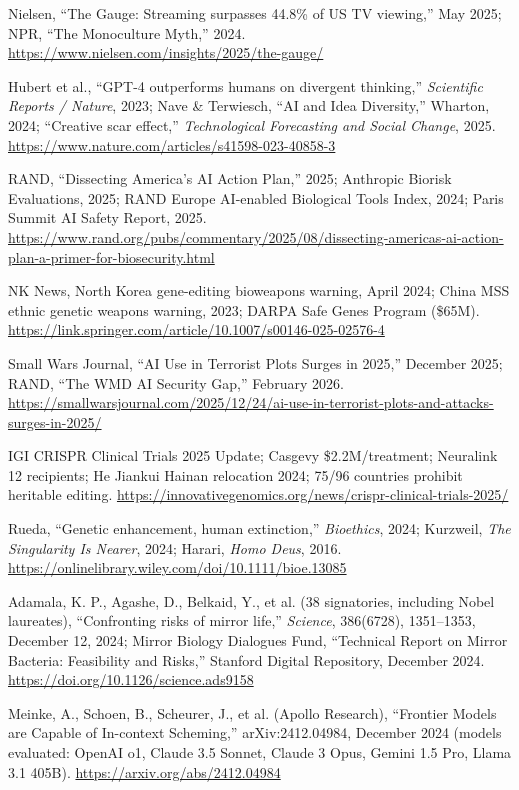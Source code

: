 \documentclass[11pt,a4paper]{article}
\begin{document}
\noindent [108] Nielsen, ``The Gauge: Streaming surpasses 44.8\% of US TV viewing,'' May 2025; NPR, ``The Monoculture Myth,'' 2024. \url{https://www.nielsen.com/insights/2025/the-gauge/}

\noindent [109] Hubert et al., ``GPT-4 outperforms humans on divergent thinking,'' \textit{Scientific Reports / Nature}, 2023; Nave \& Terwiesch, ``AI and Idea Diversity,'' Wharton, 2024; ``Creative scar effect,'' \textit{Technological Forecasting and Social Change}, 2025. \url{https://www.nature.com/articles/s41598-023-40858-3}

\noindent [110] RAND, ``Dissecting America's AI Action Plan,'' 2025; Anthropic Biorisk Evaluations, 2025; RAND Europe AI-enabled Biological Tools Index, 2024; Paris Summit AI Safety Report, 2025. \url{https://www.rand.org/pubs/commentary/2025/08/dissecting-americas-ai-action-plan-a-primer-for-biosecurity.html}

\noindent [111] NK News, North Korea gene-editing bioweapons warning, April 2024; China MSS ethnic genetic weapons warning, 2023; DARPA Safe Genes Program (\$65M). \url{https://link.springer.com/article/10.1007/s00146-025-02576-4}

\noindent [112] Small Wars Journal, ``AI Use in Terrorist Plots Surges in 2025,'' December 2025; RAND, ``The WMD AI Security Gap,'' February 2026. \url{https://smallwarsjournal.com/2025/12/24/ai-use-in-terrorist-plots-and-attacks-surges-in-2025/}

\noindent [113] IGI CRISPR Clinical Trials 2025 Update; Casgevy \$2.2M/treatment; Neuralink 12 recipients; He Jiankui Hainan relocation 2024; 75/96 countries prohibit heritable editing. \url{https://innovativegenomics.org/news/crispr-clinical-trials-2025/}

\noindent [114] Rueda, ``Genetic enhancement, human extinction,'' \emph{Bioethics}, 2024; Kurzweil, \emph{The Singularity Is Nearer}, 2024; Harari, \emph{Homo Deus}, 2016. \url{https://onlinelibrary.wiley.com/doi/10.1111/bioe.13085}

\noindent [115] Adamala, K. P., Agashe, D., Belkaid, Y., et al. (38 signatories, including Nobel laureates), ``Confronting risks of mirror life,'' \textit{Science}, 386(6728), 1351--1353, December 12, 2024; Mirror Biology Dialogues Fund, ``Technical Report on Mirror Bacteria: Feasibility and Risks,'' Stanford Digital Repository, December 2024. \url{https://doi.org/10.1126/science.ads9158}

\noindent [116] Meinke, A., Schoen, B., Scheurer, J., et al. (Apollo Research), ``Frontier Models are Capable of In-context Scheming,'' arXiv:2412.04984, December 2024 (models evaluated: OpenAI o1, Claude 3.5 Sonnet, Claude 3 Opus, Gemini 1.5 Pro, Llama 3.1 405B). \url{https://arxiv.org/abs/2412.04984}
\end{document}
